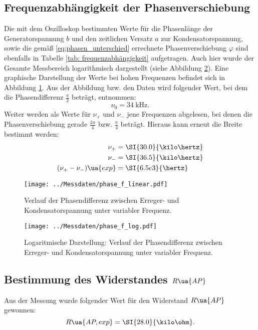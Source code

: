 \subsection{Frequenzabhängigkeit der Phasenverschiebung}
Die mit dem Oszilloskop bestimmten Werte für die Phasenlänge der Generatorspannung $b$ und den zeitlichen Versatz $a$ zur Kondensatorspannung, sowie die gemäß \eqref{eq:phasen_unterschied}
errechnete Phasenverschiebung $\varphi$ sind ebenfalls in Tabelle \ref{tab: frequenzabhängigkeit} aufgetragen. Auch hier wurde der Gesamte
Messbereich logarithmisch dargestellt (siehe Abbildung \ref{fig: phasenverlauf_log}). Eine graphische Darstellung der Werte bei hohen Frequenzen befindet sich in
Abbildung \ref{fig: phasenverlauf}. Aus der Abbildung bzw. den Daten wird folgender Wert, bei dem die Phasendifferenz $\frac{\pi}{2}$ beträgt, entnommen:
\begin{equation}
  \nu_0 = \SI{34}{\kilo\hertz}.
\end{equation}
Weiter werden als Werte für $\nu_+$ und $\nu_-$ jene Frequenzen abgelesen, bei denen die Phasenverschiebung
gerade $\frac{3\pi}{4}$ bzw. $\frac{\pi}{4}$ beträgt. Hieraus kann erneut die Breite bestimmt werden:
\begin{align}
  \begin{aligned}
  \nu_{+} &= \SI{30.0}{\kilo\hertz} \\
  \nu_{-} &= \SI{36.5}{\kilo\hertz} \\
  (\nu_{+}-\nu_{-})\ua{exp} &= \SI{6.5e3}{\hertz} \\
\end{aligned}
\end{align}


\begin{figure}
  \centering
  \texttt{[image: ../Messdaten/phase\_f\_linear.pdf]}
  \caption{Verlauf der Phasendifferenz zwischen Erreger- und Kondensatorspannung unter variabler Frequenz.}
  \label{fig: phasenverlauf}
\end{figure}
\begin{figure}
  \centering
  \texttt{[image: ../Messdaten/phase\_f\_log.pdf]}
  \caption{Logaritmische Darstellung: Verlauf der Phasendifferenz zwischen Erreger- und Kondensatorspannung unter variabler Frequenz.}
  \label{fig: phasenverlauf_log}
\end{figure}

\subsection{Bestimmung des Widerstandes $R\ua{AP}$}
Aus der Messung wurde folgender Wert für den Widerstand $R\ua{AP}$ gewonnen:
\begin{equation}
  R\ua{AP, exp} = \SI{28.0}{\kilo\ohm}.
\end{equation}
